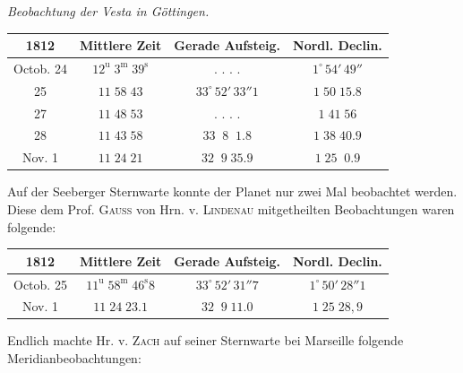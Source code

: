\medskip
{}\begin{center}
\emph{Beobachtung der Vesta in Göttingen.}\par
\fontsize{10}{12}\selectfont\setlength{\tabcolsep}{4pt}\renewcommand{\arraystretch}{1.15}\begin{tabular}{|c|c|c|c|}
\hline
1812 & Mittlere Zeit & Gerade Aufsteig. & Nordl. Declin. \\
\hline
Octob. 24 & $12^{\mathrm u}\;3^{\mathrm m}\;39^{\mathrm s}$ & . . . . & $1^\circ\,54'\,49''$ \\
25 & $11\;58\;43$ & $33^\circ\,52'\,33''1$ & $1\;50\;15.8$ \\
27 & $11\;48\;53$ & . . . . & $1\;41\;56$ \\
28 & $11\;43\;58$ & $33\;\;8\;\;1.8$ & $1\;38\;40.9$ \\
Nov. 1 & $11\;24\;21$ & $32\;\;9\;35.9$ & $1\;25\;\;0.9$ \\
\hline
\end{tabular}
\end{center}

\par\indent Auf der Seeberger Sternwarte konnte der Planet nur zwei Mal beobachtet werden. Diese dem Prof. \textsc{Gauss}
von Hrn. v. \textsc{Lindenau} mitgetheilten Beobachtungen waren folgende:

\begin{center}
\fontsize{10}{12}\selectfont\setlength{\tabcolsep}{4pt}\renewcommand{\arraystretch}{1.15}\begin{tabular}{|c|c|c|c|}
\hline
1812 & Mittlere Zeit & Gerade Aufsteig. & Nordl. Declin. \\
\hline
Octob. 25 & $11^{\mathrm u}\;58^{\mathrm m}\;46^{\mathrm s}8$ & $33^\circ\,52'\,31''7$ & $1^\circ\,50'\,28''1$ \\
Nov. 1 & $11\;24\;23.1$ & $32\;\;9\;11.0$ & $1\;25\;28{,}9$ \\
\hline
\end{tabular}
\end{center}

\par\indent Endlich machte Hr. v. \textsc{Zach} auf seiner Sternwarte bei Marseille folgende Meridianbeobachtungen:

